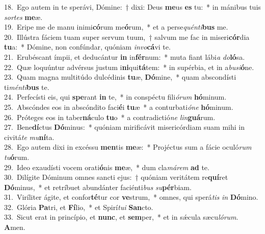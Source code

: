 {18.~}Ego autem in te sperávi, Dómine:~† dixi: Deus \textbf{me}us \textbf{es} tu:~* in mánibus tuis \textit{sor}\textit{tes} \textbf{me}æ.\\
{19.~}Eripe me de manu inimi\textbf{có}rum me\textbf{ó}rum,~* et a perse\textit{quén}\textit{ti}\textbf{bus} me.\\
{20.~}Illústra fáciem tuam super servum tuum,~† salvum me fac in miseri\textbf{cór}dia \textbf{tu}a:~* Dómine, non confúndar, quóniam \textit{in}\textit{vo}\textbf{cá}vi te.\\
{21.~}Erubéscant ímpii, et deducántur \textbf{in} in\textbf{fér}num:~* muta fiant lábi\textit{a} \textit{do}\textbf{ló}sa.\\
{22.~}Quæ loquúntur advérsus justum i\textbf{ni}qui\textbf{tá}tem:~* in supérbia, et in a\textit{bu}\textit{si}\textbf{ó}ne.\\
{23.~}Quam magna multitúdo dulcédinis \textbf{tu}æ, \textbf{Dó}mine,~* quam abscondísti ti\textit{mén}\textit{ti}\textbf{bus} te.\\
{24.~}Perfecísti eis, qui \textbf{spe}rant \textbf{in} te,~* in conspéctu fili\textit{ó}\textit{rum} \textbf{hó}minum.\\
{25.~}Abscóndes eos in abscóndito faci\textbf{é}i \textbf{tu}æ~* a conturbati\textit{ó}\textit{ne} \textbf{hó}minum.\\
{26.~}Próteges eos in taber\textbf{ná}culo \textbf{tu}o~* a contradictió\textit{ne} \textit{lin}\textbf{guá}rum.\\
{27.~}Bene\textbf{dí}ctus \textbf{Dó}minus:~* quóniam mirificávit misericórdiam suam mihi in civitá\textit{te} \textit{mu}\textbf{ní}ta.\\
{28.~}Ego autem dixi in excéssu \textbf{men}tis \textbf{me}æ:~* Projéctus sum a fácie oculó\textit{rum} \textit{tu}\textbf{ó}rum.\\
{29.~}Ideo exaudísti vocem orati\textbf{ó}nis \textbf{me}æ,~* dum cla\textit{má}\textit{rem} \textbf{ad} te.\\
{30.~}Dilígite Dóminum omnes sancti ejus:~† quóniam veritátem re\textbf{quí}ret \textbf{Dó}minus,~* et retríbuet abundánter faciénti\textit{bus} \textit{su}\textbf{pér}biam.\\
{31.~}Viríliter ágite, et confor\textbf{té}tur cor \textbf{ve}strum,~* omnes, qui sperá\textit{tis} \textit{in} \textbf{Dó}mino.\\
{32.~}Glória \textbf{Pa}tri, et \textbf{Fí}lio,~* et Spirí\textit{tu}\textit{i} \textbf{San}cto.\\
{33.~}Sicut erat in princípio, et \textbf{nunc}, et \textbf{sem}per,~* et in sǽcula sæcu\textit{ló}\textit{rum}. \textbf{A}men.\\
